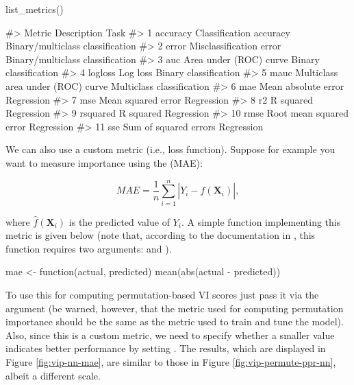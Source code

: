 \begin{Schunk}
\begin{Sinput}
list_metrics()
\end{Sinput}
\begin{Soutput}
#>      Metric                       Description                             Task
#> 1  accuracy           Classification accuracy Binary/multiclass classification
#> 2     error           Misclassification error Binary/multiclass classification
#> 3       auc            Area under (ROC) curve            Binary classification
#> 4   logloss                          Log loss            Binary classification
#> 5      mauc Multiclass area under (ROC) curve        Multiclass classification
#> 6       mae               Mean absolute error                       Regression
#> 7       mse                Mean squared error                       Regression
#> 8        r2                         R squared                       Regression
#> 9  rsquared                         R squared                       Regression
#> 10     rmse           Root mean squared error                       Regression
#> 11      sse             Sum of squared errors                       Regression
\end{Soutput}
\end{Schunk}

We can also use a custom metric (i.e., loss function). Suppose for
example you want to measure importance using the
 (MAE):

\begin{equation}
  MAE = \frac{1}{n}\sum_{i = 1}^n\left|Y_i - \widehat{f}\left(\boldsymbol{X}_i\right)\right|,
\end{equation}

where \(\widehat{f}\left(\boldsymbol{X}_i\right)\) is the predicted
value of \(Y_i\). A simple function implementing this metric is given
below (note that, according to the documentation in ,
this function requires two arguments:  and
).

\begin{Schunk}
\begin{Sinput}
mae <- function(actual, predicted) {
  mean(abs(actual - predicted))
}
\end{Sinput}
\end{Schunk}

To use this for computing permutation-based VI scores just pass it via
the  argument (be warned, however, that the metric used for
computing permutation importance should be the same as the metric used
to train and tune the model). Also, since this is a custom metric, we
need to specify whether a smaller value indicates better performance by
setting . The results, which are
displayed in Figure \ref{fig:vip-nn-mae}, are similar to those in Figure
\ref{fig:vip-permute-ppr-nn}, albeit a different scale.

